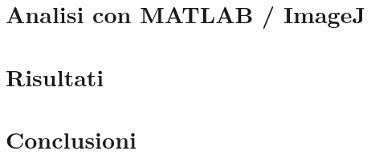 \documentclass[a4paper, 11pt, italian, oneside]{book}
\begin{document}
\chapter{Analisi con MATLAB / ImageJ}
\chapter{Risultati}
\chapter{Conclusioni}


\backmatter
\printglossary[title=Glossario, toctitle=Glossario]
\printglossary[type=\acronymtype]

\end{document}
